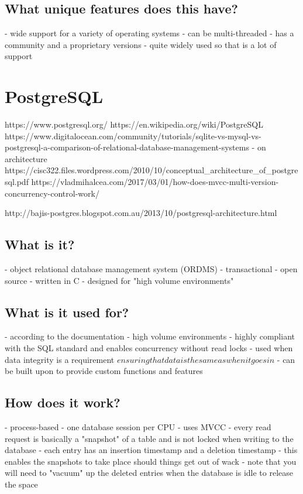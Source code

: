 \section{What unique features does this have?}
- wide support for a variety of operating systems
- can be multi-threaded
- has a community and a proprietary versions
- quite widely used so that is a lot of support

\chapter{PostgreSQL}
https://www.postgresql.org/
https://en.wikipedia.org/wiki/PostgreSQL
https://www.digitalocean.com/community/tutorials/sqlite-vs-mysql-vs-postgresql-a-comparison-of-relational-database-management-systems
- on architecture
https://cisc322.files.wordpress.com/2010/10/conceptual_architecture_of_postgresql.pdf
https://vladmihalcea.com/2017/03/01/how-does-mvcc-multi-version-concurrency-control-work/

http://bajis-postgres.blogspot.com.au/2013/10/postgresql-architecture.html

\section{What is it?}
- object relational database management system (ORDMS)
- transactional
- open source
- written in C
- designed for "high volume environments"

\section{What is it used for?}
- according to the documentation - high volume environments
- highly compliant with the SQL standard and enables concurrency without read locks
- used when data integrity is a requirement \(ensuring that data is the same as when it goes in\)
- can be built upon to provide custom functions and features

\section{How does it work?}
- process-based - one database session per CPU
- uses MVCC - every read request is basically a "snapshot" of a table and is not locked when writing to the database
- each entry has an insertion timestamp and a deletion timestamp - this enables the snapshots to take place should things get out of wack
- note that you will need to "vacuum" up the deleted entries when the database is idle to release the space

